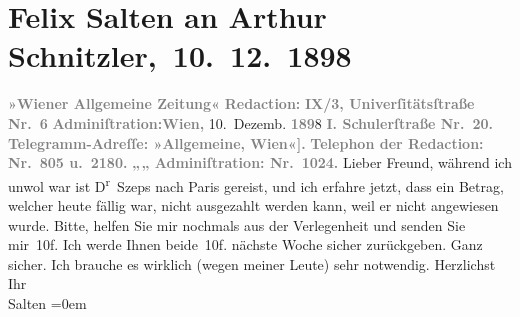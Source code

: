 

         
         \renewcommand{\erwaehntePersonen}{Personen: Julius Szeps}
         \renewcommand{\erwaehnteInstitutionen}{Institutionen: Wiener Allgemeine Zeitung}
         \renewcommand{\erwaehnteOrte}{Orte: Paris, Schulerstraße, Universitätsstraße, Wien}
         \renewcommand{\erwaehnteWerke}{}
               \section[ Felix Salten an Arthur Schnitzler, 10. 12. 1898]{ Felix Salten an Arthur Schnitzler, 10. 12. 1898}\nopagebreak{}\rehead{ }\begin{ledgroupsized}[t]{13cm}\normalsize\beginnumbering \toendnotes[C]{\smallbreak\pagebreak[2]} 
\pstart
           \noindent{}{\pb}\textcolor{gray}{\textbf{\textbf{»Wiener Allgemeine
                        Zeitung«}}}\pend
           \pstart
           \textcolor{gray}{\textbf{Redaction:}}\pend
           \pstart
           \textcolor{gray}{\textbf{\textbf{IX/3, Univerſitätsſtraße Nr. 6}}}\pend
           \pstart
           \textcolor{gray}{\textbf{Adminiſtration:}}\hfill \textcolor{gray}{\textbf{Wien,}}{ }10. Dezemb. \textcolor{gray}{\textbf{189}}8\pend
           \pstart
           \textcolor{gray}{\textbf{\textbf{I. Schulerſtraße Nr. 20.}}}\pend
           \pstart
           \textcolor{gray}{\textbf{Telegramm-Adreſſe: »Allgemeine, Wien\oindex{Wien@\textbf{Wien}|pw}{[}«{]}.}}\pend
           \pstart
           \textcolor{gray}{\textbf{Telephon der Redaction: Nr. 805 u. 2180.}}\pend
           \pstart
           \textcolor{gray}{\textbf{\hspace*{1.5em}„\hspace*{1.5em}„\hspace*{1.5em} Adminiſtration: Nr. 1024.}}\pend
           \pstart{}Lieber Freund,\pend\pstart
           während ich unwol war ist D\textsuperscript{r} Szeps nach Paris gereist,
               und ich erfahre jetzt, dass ein Betrag, welcher heute
               fällig war, nicht ausgezahlt werden kann, weil er nicht angewiesen wurde. Bitte,
               helfen Sie mir nochmals aus der Verlegenheit und senden Sie mir 10f. Ich werde Ihnen
               beide 10f. nächste Woche sicher zurückgeben. Ganz sicher. Ich brauche es wirklich
               (wegen meiner Leute) sehr notwendig.\pend
           \pstart
           Herzlichst Ihr {\\[\baselineskip]}\spacefill\mbox{Salten}\pend
           \leftskip=0em{}
         

\end{ledgroupsized}

